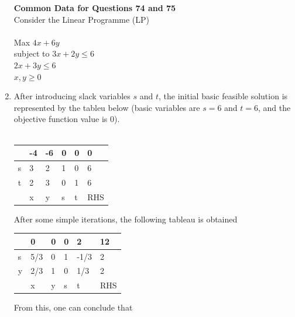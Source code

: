 \documentclass[journal,12pt,onecolumn]{IEEEtran}
\begin{document}
\begin{enumerate}
          \normalsize\textbf{Common Data for Questions 74 and 75}\\
          Consider the Linear Programme (LP)\\\\
          Max $4x + 6y$\\
          subject to
          $3x+2y\le6$\\
          $2x+3y\le6$\\
          $x,y\ge0$

    \item After introducing slack variables $s$ and $t$, the initial basic feasible solution is represented by the tableu below (basic variables are $s=6$ and $t=6$, and the objective function value is 0).\\\\
          \begin{center}
              \begin{tabular}{|l|l|l|l|l|l|}
                  \hline
                    & -4 & -6 & 0 & 0 & 0   \\\hline
                  s & 3  & 2  & 1 & 0 & 6   \\\hline
                  t & 2  & 3  & 0 & 1 & 6   \\\hline
                    & x  & y  & s & t & RHS \\\hline
              \end{tabular}
          \end{center}
          After some simple iterations, the following tableau is obtained
          \begin{center}
              \begin{tabular}{|l|l|l|l|l|l|}
                  \hline
                    & 0   & 0 & 0 & 2    & 12  \\\hline
                  s & 5/3 & 0 & 1 & -1/3 & 2   \\\hline
                  y & 2/3 & 1 & 0 & 1/3  & 2   \\\hline
                    & x   & y & s & t    & RHS \\\hline
              \end{tabular}
          \end{center}
          From this, one can conclude that

          \begin{enumerate}
          \end{enumerate}


\end{enumerate}
\end{document}
